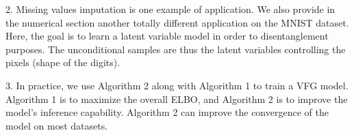 \documentclass{article}
\let\oldemptyset\emptyset
\let\emptyset\varnothing
\begin{document}
2. Missing values imputation is one example of application. We also provide in the numerical section another totally different application on the MNIST dataset. Here, the goal is to learn a latent variable model in order to disentanglement purposes. The unconditional samples are thus the latent variables controlling the pixels (shape of the digits).

3.  In practice, we use Algorithm 2 along with Algorithm 1 to train a VFG model.  Algorithm 1 is to maximize the overall ELBO, and Algorithm 2 is to improve the model's inference capability. Algorithm 2 can improve the convergence of the model on most datasets.  



\end{document}
